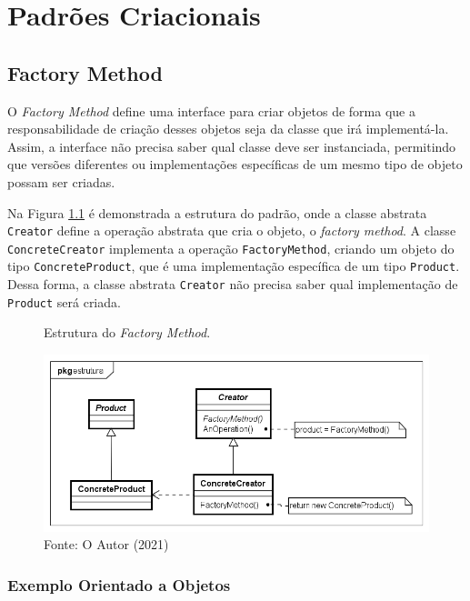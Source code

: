 \chapter{Padrões Criacionais}

\section{Factory Method}

O \textit{Factory Method} define uma interface para criar 
objetos de forma que a responsabilidade de criação 
desses objetos seja da classe que irá implementá-la. 
Assim, a interface não precisa saber qual 
classe deve ser instanciada, permitindo que versões 
diferentes ou implementações específicas de um mesmo 
tipo de objeto possam ser criadas.\cite{gamma:1995}

Na Figura \ref{fmethod_struct} é demonstrada 
a estrutura do padrão, onde a classe abstrata \texttt{Creator} 
define a operação abstrata que cria o objeto, 
o \textit{factory method}. A classe \texttt{ConcreteCreator} 
implementa a operação \texttt{FactoryMethod}, criando um objeto 
do tipo \texttt{ConcreteProduct}, que é uma implementação 
específica de um tipo \texttt{Product}. Dessa forma, a classe 
abstrata \texttt{Creator} não precisa saber qual implementação 
de \texttt{Product} será criada.

\begin{figure}[htb]
	\caption{\label{fmethod_struct}Estrutura do \textit{Factory Method}.}
	\begin{center}
	    \includegraphics[scale=0.5]{5_padroes-contexto-funcional/5.1_criacionais/5.1.1_factory-method/factorymethod_struct.png}
	\end{center}
  \caption*{Fonte: O Autor (2021)}
\end{figure}


\subsection*{Exemplo Orientado a Objetos}

